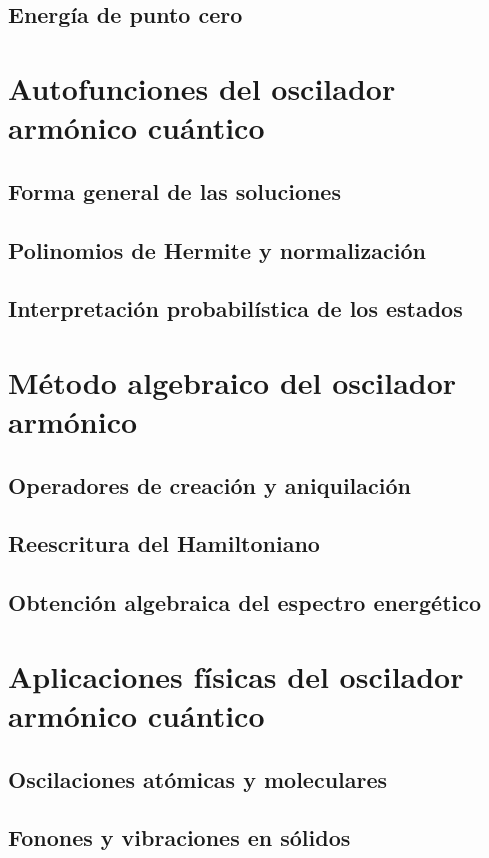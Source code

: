 \documentclass[11pt,a4paper,spanish]{book}
\begin{document}
\subsection{Energía de punto cero}

\section{Autofunciones del oscilador armónico cuántico}
\subsection{Forma general de las soluciones}
\subsection{Polinomios de Hermite y normalización}
\subsection{Interpretación probabilística de los estados}

\section{Método algebraico del oscilador armónico}
\subsection{Operadores de creación y aniquilación}
\subsection{Reescritura del Hamiltoniano}
\subsection{Obtención algebraica del espectro energético}

\section{Aplicaciones físicas del oscilador armónico cuántico}
\subsection{Oscilaciones atómicas y moleculares}
\subsection{Fonones y vibraciones en sólidos}
\end{document}
